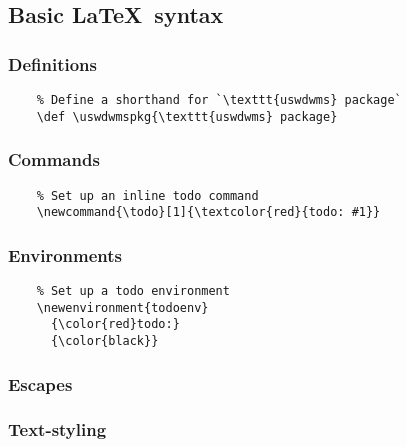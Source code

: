 \subsection{Basic \LaTeX\ syntax}
\subsubsection*{Definitions}
\begin{listing}[H]
  \captionsetup{skip=\skiplistingcaptionlen}
  \begin{verbatim}
    % Define a shorthand for `\texttt{uswdwms} package`
    \def \uswdwmspkg{\texttt{uswdwms} package}
  \end{verbatim}
  \caption{\texttt{\textbackslash def} command examples}
  \label{example:lst:def}
\end{listing}
\subsubsection*{Commands}
\begin{listing}[H]
  \captionsetup{skip=\skiplistingcaptionlen}
  \begin{verbatim}
    % Set up an inline todo command
    \newcommand{\todo}[1]{\textcolor{red}{todo: #1}}
  \end{verbatim}
  \caption{\texttt{\textbackslash newcommand} command example}
  \label{example:lst:newcommand}
\end{listing}
\subsubsection*{Environments}
\begin{listing}[H]
  \captionsetup{skip=\skiplistingcaptionlen}
  \begin{verbatim}
    % Set up a todo environment
    \newenvironment{todoenv}
      {\color{red}todo:}
      {\color{black}}
  \end{verbatim}
  \caption{\texttt{\textbackslash newenvironment} command example}
  \label{example:lst:newenvironment}
\end{listing}
\subsubsection*{Escapes}

\subsubsection*{Text-styling}

